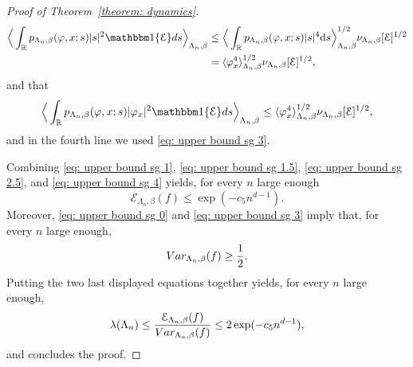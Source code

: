 \documentclass[11pt,a4paper]{article}
\theoremstyle{definition}
\numberwithin{equation}{section}
\begin{document}
\begin{proof}[Proof of Theorem~\textup{\ref{theorem: dynamics}}]
\begin{align}
\Big\langle \int_{\mathbb R} p_{\Lambda_n,\beta}(\varphi,x;s)|s|^2\mathbbm 1\{\mathcal{E}\}{\rm d}s  \Big\rangle_{\Lambda_n,\beta}&\leq \Big\langle \int_{\mathbb R}p_{\Lambda_n,\beta}(\varphi,x;s)|s|^4\mathrm{d}s\Big\rangle_{\Lambda_n,\beta}^{1/2}\nu_{\Lambda_n,\beta}[\mathcal{E}]^{1/2}\\&=\langle \varphi_x^4\rangle_{\Lambda_n,\beta}^{1/2}\nu_{\Lambda_n,\beta}[\mathcal{E}]^{1/2},
\end{align}
and that
\begin{equation}
\Big\langle \int_{\mathbb R} p_{\Lambda_n,\beta}(\varphi,x;s)|\varphi_x|^2\mathbbm 1\{\mathcal{E}\}{\rm d}s  \Big\rangle_{\Lambda_n,\beta}\leq \langle \varphi_x^4\rangle_{\Lambda_n,\beta}^{1/2}\nu_{\Lambda_n,\beta}[\mathcal{E}]^{1/2},
\end{equation}
and in the fourth line we used \eqref{eq: upper bound sg 3}.

Combining \eqref{eq: upper bound sg 1}, \eqref{eq: upper bound sg 1.5}, \eqref{eq: upper bound sg 2.5}, and \eqref{eq: upper bound sg 4} yields, for every $n$ large enough
\begin{equation}
    \mathcal{E}_{\Lambda_n,\beta}(f)\leq \exp(-c_5n^{d-1}).
\end{equation}
Moreover, \eqref{eq: upper bound sg 0} and \eqref{eq: upper bound sg 3} imply that, for every $n$ large enough,
\begin{equation}
    \textup{Var}_{\Lambda_n,\beta}(f)\geq \frac{1}{2}.
\end{equation}
Putting the two last displayed equations together yields, for every $n$ large enough,
\begin{equation}
    \lambda(\Lambda_n)\leq \frac{\mathcal{E}_{\Lambda_n,\beta}(f)}{\textup{Var}_{\Lambda_n,\beta}(f)}\leq 2\exp(-c_5n^{d-1}),
\end{equation}
and concludes the proof.
\end{proof}
\end{document}
